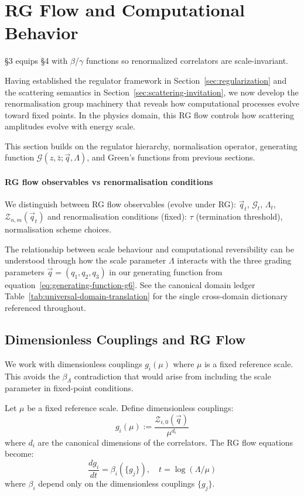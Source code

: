 \section{RG Flow and Computational Behavior}
\label{sec:rg-flow}

§3 equips §4 with $\beta$/$\gamma$ functions so renormalized correlators are scale-invariant.

Having established the regulator framework in Section~\ref{sec:regularization} and the scattering semantics in Section~\ref{sec:scattering-invitation}, we now develop the renormalisation group machinery \cite{kadanoff1966,wilson1971,wilson1974} that reveals how computational processes evolve toward fixed points. In the physics domain, this RG flow controls how scattering amplitudes evolve with energy scale.

This section builds on the regulator hierarchy, normalisation operator, generating function $\mathcal{G}(z,\bar{z};\vec{q},\Lambda)$, and Green's functions from previous sections.

\paragraph{RG flow observables vs renormalisation conditions}
We distinguish between RG flow observables (evolve under RG): $\vec{q}_t$, $\mathcal{G}_t$, $\Lambda_t$, $\mathcal{Z}_{n,m}(\vec{q}_t)$ and renormalisation conditions (fixed): $\tau$ (termination threshold), normalisation scheme choices.

The relationship between scale behaviour and computational reversibility can be understood through how the scale parameter $\Lambda$ interacts with the three grading parameters $\vec{q} = (q_1,q_2,q_3)$ in our generating function from equation~\eqref{eq:generating-function-g6}. See the canonical domain ledger Table~\ref{tab:universal-domain-translation} for the single cross-domain dictionary referenced throughout.

\subsection{Dimensionless Couplings and RG Flow}

We work with dimensionless couplings $g_i(\mu)$ where $\mu$ is a fixed reference scale. This avoids the $\beta_\Lambda$ contradiction that would arise from including the scale parameter in fixed-point conditions.

\begin{definition}
\label{def:dimensionless-couplings}
Let $\mu$ be a fixed reference scale. Define dimensionless couplings:
\[
g_i(\mu) := \frac{\mathcal{Z}_{i,0}(\vec{q})}{\mu^{d_i}}
\]
where $d_i$ are the canonical dimensions of the correlators. The RG flow equations become:
\[
\frac{dg_i}{dt} = \beta_i(\{g_j\}), \quad t = \log(\Lambda/\mu)
\]
where $\beta_i$ depend only on the dimensionless couplings $\{g_j\}$.
\end{definition}

